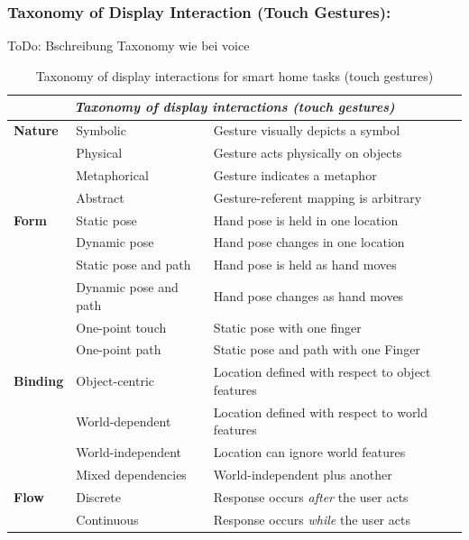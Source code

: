 \documentclass[sigchi]{acmart}
\begin{document}
	\subsubsection{Taxonomy of Display Interaction (Touch Gestures):}	
	ToDo: Bschreibung Taxonomy wie bei voice
	\begin{table}[t]
		\begin{center}
			\caption{Taxonomy of display interactions for smart home tasks (touch gestures)}
			\label{tab:taxDisplayTG}
			\begin{footnotesize}
				\begin{tabular}{p{} p{} p{}} \toprule
					\multicolumn{3}{c}{\textit{Taxonomy of display interactions (touch gestures)}} \\ \midrule
					\textbf{Nature}		& Symbolic		& Gesture visually depicts a symbol \\
										& Physical		& Gesture acts physically on objects \\ 
										& Metaphorical 	& Gesture indicates a metaphor \\ 
										& Abstract		& Gesture-referent mapping is arbitrary \\ \midrule
					\textbf{Form} 		& Static pose	& Hand pose is held in one location \\
										& Dynamic pose	& Hand pose changes in one location \\
										& Static pose and path 	& Hand pose is held as hand moves \\
										& Dynamic pose and path	& Hand pose changes as hand moves \\
										& One-point touch	& Static pose with one finger \\ 
										& One-point path	& Static pose and path with one Finger \\ \midrule
					\textbf{Binding}	& Object-centric 	& Location defined with respect to object features \\
										& World-dependent 	& Location defined with respect to world features \\
										& World-independent & Location can ignore world features \\
										& Mixed dependencies	& World-independent plus another \\ \midrule
					\textbf{Flow}		& Discrete		& Response occurs \textit{after} the user acts \\ 
										& Continuous 	& Response occurs \textit{while} the user acts  \\ \bottomrule
				\end{tabular}
			\end{footnotesize}
		\end{center}
	\end{table}
\end{document}
